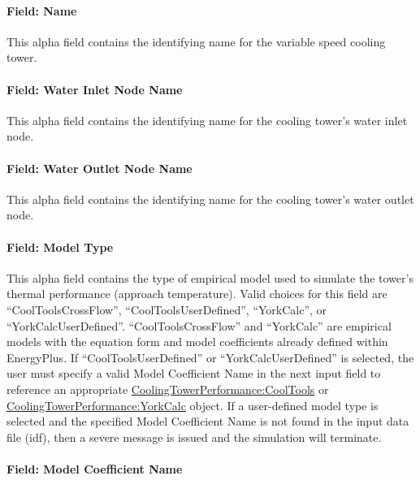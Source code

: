 \paragraph{Field: Name}\label{field-name-2-005}

This alpha field contains the identifying name for the variable speed cooling tower.

\paragraph{Field: Water Inlet Node Name}\label{field-water-inlet-node-name-3}

This alpha field contains the identifying name for the cooling tower's water inlet node.

\paragraph{Field: Water Outlet Node Name}\label{field-water-outlet-node-name-3}

This alpha field contains the identifying name for the cooling tower's water outlet node.

\paragraph{Field: Model Type}\label{field-model-type}

This alpha field contains the type of empirical model used to simulate the tower's thermal performance (approach temperature). Valid choices for this field are ``CoolToolsCrossFlow'', ``CoolToolsUserDefined'', ``YorkCalc'', or ``YorkCalcUserDefined''. ``CoolToolsCrossFlow'' and ``YorkCalc'' are empirical models with the equation form and model coefficients already defined within EnergyPlus. If ``CoolToolsUserDefined'' or ``YorkCalcUserDefined'' is selected, the user must specify a valid Model Coefficient Name in the next input field to reference an appropriate \hyperref[coolingtowerperformancecooltools]{CoolingTowerPerformance:CoolTools} or \hyperref[coolingtowerperformanceyorkcalc]{CoolingTowerPerformance:YorkCalc} object. If a user-defined model type is selected and the specified Model Coefficient Name is not found in the input data file (idf), then a severe message is issued and the simulation will terminate.

\paragraph{Field: Model Coefficient Name}\label{field-model-coefficient-name}

